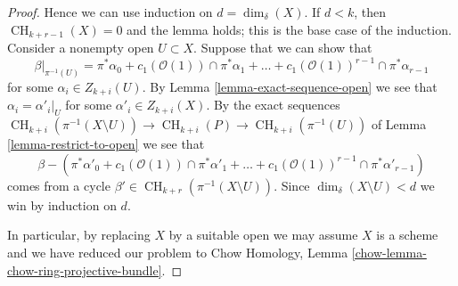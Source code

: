 \documentclass[10pt,a4paper]{amsart}
\theoremstyle{plain}
\theoremstyle{definition}
\theoremstyle{remark}
\numberwithin{equation}{subsection}
\def\CH{\mathop{\mathrm{CH}}\nolimits}
\begin{document}
\begin{proof}
\medskip\noindent
Hence we can use induction on $d = \dim_\delta(X)$.
If $d < k$, then $\CH_{k + r - 1}(X) = 0$ and the lemma holds;
this is the base case of the induction.
Consider a nonempty open $U \subset X$.
Suppose that we can show that
$$
\beta|_{\pi^{-1}(U)} =
\pi^*\alpha_0 +
c_1(\mathcal{O}(1)) \cap \pi^*\alpha_1 +
\ldots +
c_1(\mathcal{O}(1))^{r - 1} \cap \pi^*\alpha_{r - 1}
$$
for some $\alpha_i \in Z_{k + i}(U)$.
By Lemma \ref{lemma-exact-sequence-open} we see that
$\alpha_i = \alpha'_i|_U$ for some $\alpha'_i \in Z_{k + i}(X)$.
By the exact sequences
$\CH_{k + i}(\pi^{-1}(X \setminus U)) \to \CH_{k + i}(P) \to
\CH_{k + i}(\pi^{-1}(U))$
of Lemma \ref{lemma-restrict-to-open}
we see that
$$
\beta -
\left(\pi^*\alpha'_0 +
c_1(\mathcal{O}(1)) \cap \pi^*\alpha'_1 +
\ldots +
c_1(\mathcal{O}(1))^{r - 1} \cap \pi^*\alpha'_{r - 1}\right)
$$
comes from a cycle $\beta' \in \CH_{k + r}(\pi^{-1}(X \setminus U))$.
Since $\dim_\delta(X \setminus U) < d$ we win by
induction on $d$.

\medskip\noindent
In particular, by replacing $X$ by a suitable open we may assume
$X$ is a scheme and we have reduced our problem to
Chow Homology, Lemma \ref{chow-lemma-chow-ring-projective-bundle}.
\end{proof}
\end{document}
